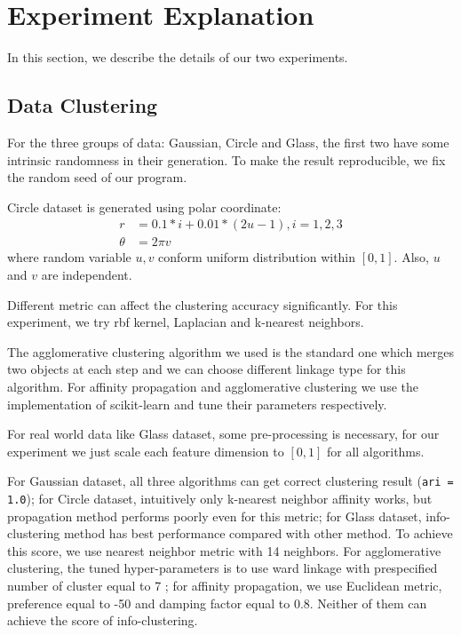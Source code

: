 \documentclass{article}
\begin{document}
\section{Experiment Explanation}
In this section, we describe the details of our two experiments. 

\subsection{Data Clustering}
For the three groups of data: \textsf{Gaussian}, \textsf{Circle} and \textsf{Glass}, the first two have some intrinsic randomness in their generation. To make the result reproducible, we fix the random seed of our program. 

\textsf{Circle} dataset is generated using polar coordinate:
\begin{align*}
r &= 0.1*i + 0.01*(2u-1), i = 1, 2, 3\\
\theta & = 2\pi v
\end{align*}
where random variable $u,v$ conform uniform distribution within $[0,1]$. Also, $u$ and $v$ are independent.

Different metric can affect the clustering accuracy significantly. For this experiment, we try rbf kernel, Laplacian and k-nearest neighbors.  

The agglomerative clustering algorithm we used is the standard one which merges two objects at each step and we can choose different linkage type for this algorithm. For \textsf{affinity propagation} and \textsf{agglomerative clustering} we use the implementation of \textsf{scikit-learn}\cite{scikit-learn} and tune their parameters respectively.

For real world data like Glass dataset, some pre-processing is necessary, for our experiment we just scale each feature dimension to $[0, 1]$ for all algorithms.

For \textsf{Gaussian} dataset, all three algorithms can get correct clustering result (\texttt{ari = 1.0}); for \textsf{Circle} dataset, intuitively only k-nearest neighbor affinity works, but propagation method performs poorly even for this metric; for \textsf{Glass} dataset, info-clustering method has best performance compared with other method. To achieve this score, we use nearest neighbor metric with 14 neighbors. For agglomerative clustering, the tuned hyper-parameters is to use ward linkage with prespecified number of cluster equal to 7 ; for affinity propagation, we use Euclidean metric, preference equal to -50 and damping factor equal to 0.8. Neither of them can achieve the score of info-clustering.
\end{document}
